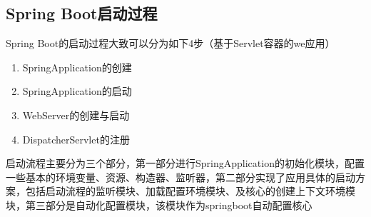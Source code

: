 \documentclass[../../../interview-questions.tex]{subfiles}
\begin{document}
\subsection{Spring Boot启动过程}

Spring Boot的启动过程大致可以分为如下4步（基于Servlet容器的we应用）

\begin{enumerate}
    \item {SpringApplication的创建}
    \item {SpringApplication的启动}
    \item {WebServer的创建与启动}
    \item {DispatcherServlet的注册}
\end{enumerate}

启动流程主要分为三个部分，第一部分进行SpringApplication的初始化模块，配置一些基本的环境变量、资源、构造器、监听器，第二部分实现了应用具体的启动方案，包括启动流程的监听模块、加载配置环境模块、及核心的创建上下文环境模块，第三部分是自动化配置模块，该模块作为springboot自动配置核心
\end{document}
